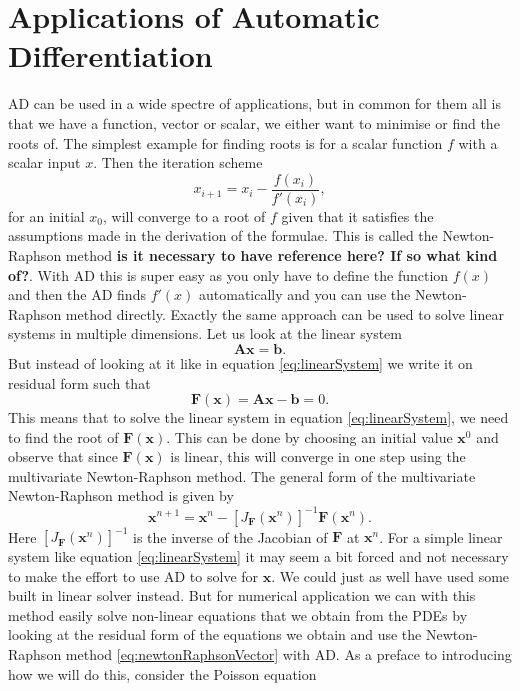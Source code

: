 \section{Applications of Automatic Differentiation}
\label{ApplicationsAD}
AD can be used in a wide spectre of applications, but in common for them all is that we have a function, vector or scalar, we either want to minimise or find the roots of. The simplest example for finding roots is for a scalar function $f$ with a scalar input $x$. Then the iteration scheme
\begin{equation*}
    x_{i+1} = x_i - \frac{f(x_i)}{f'(x_i)},
\end{equation*}
for an initial $x_0$, will converge to a root of $f$ given that it satisfies the assumptions made in the derivation of the formulae. This is called the Newton-Raphson method \textbf{is it necessary to have reference here? If so what kind of?}. With AD this is super easy as you only have to define the function $f(x)$ and then the AD finds $f'(x)$ automatically and you can use the Newton-Raphson method directly. Exactly the same approach can be used to solve linear systems in multiple dimensions. Let us look at the linear system 
\begin{equation}
    \textbf{A}\boldsymbol{x} = \textbf{b}.
    \label{eq:linearSystem}
\end{equation}
But instead of looking at it like in equation \eqref{eq:linearSystem} we write it on residual form such that
\begin{equation*}
	\boldsymbol{F}(\boldsymbol{x}) = \textbf{A}\boldsymbol{x} - \boldsymbol{b} = 0 .
\end{equation*}
This means that to solve the linear system in equation \eqref{eq:linearSystem}, we need to find the root of $\boldsymbol{F}(\boldsymbol{x})$. This can be done by choosing an initial value $\boldsymbol{x}^0$ and observe that since $\boldsymbol{F}(\boldsymbol{x})$ is linear, this will converge in one step using the multivariate Newton-Raphson method. The general form of the multivariate Newton-Raphson method is given by
\begin{equation}
	\boldsymbol{x}^{n+1} = \boldsymbol{x}^n - \left[J_{\boldsymbol{F}}  (\boldsymbol{x}^n)\right]^{-1} \boldsymbol{F}(\boldsymbol{x}^n).
    \label{eq:newtonRaphsonVector}
\end{equation}
Here $\left[J_{\boldsymbol{F}}  (\boldsymbol{x}^n)\right]^{-1}$ is the inverse of the Jacobian of $\boldsymbol{F}$ at $\boldsymbol{x}^n$. For a simple linear system like equation \eqref{eq:linearSystem} it may seem a bit forced and not necessary to make the effort to use AD to solve for $\boldsymbol{x}$. We could just as well have used some built in linear solver instead. But for numerical application we can with this method easily solve non-linear equations that we obtain from the PDEs by looking at the residual form of the equations we obtain and use the Newton-Raphson method \eqref{eq:newtonRaphsonVector} with AD. As a preface to introducing how we will do this, consider the Poisson equation
